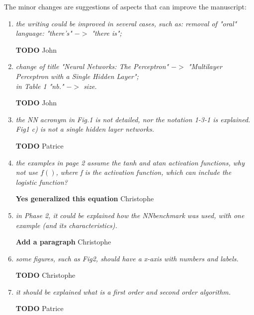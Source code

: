 \documentclass[12pt]{article}
\newcommand{\red}[1]{{\color{red}#1}}
\begin{document}
The minor changes are suggestions of aspects that can improve the manuscript:
\begin{enumerate}
\item \textit{the writing could be improved in several cases, such as: removal of "oral" language: "there’s" $->$ "there is";}

\textbf{TODO}
\red{John}

\item \textit{change of title "Neural Networks: The Perceptron" $->$ "Multilayer Perceptron with a Single Hidden Layer";\\
 in Table 1 "nb." $->$ size.}
 
 \textbf{TODO}
\red{John}

\item \textit{the NN acronym in Fig.1 is not detailed, nor the notation 1-3-1 is explained.\\ 
Fig1 c) is not a single hidden layer networks.}

\textbf{TODO}
\red{Patrice}

\item \textit{the examples in page 2 assume the tanh and atan activation functions, why not use $f()$, where f is the activation function, which can include the logistic function?}

\textbf{Yes generalized this equation}
\red{Christophe}

\item \textit{in Phase 2, it could be explained how the NNbenchmark was used, with one example (and its characteristics).}

\textbf{Add a paragraph}
\red{Christophe}

\item \textit{some figures, such as Fig2, should have a x-axis with numbers and labels.}

\textbf{TODO}
\red{Christophe}

\item \textit{it should be explained what is a first order and second order algorithm.}

\textbf{TODO}
\red{Patrice}

\end{enumerate}
\end{document}
